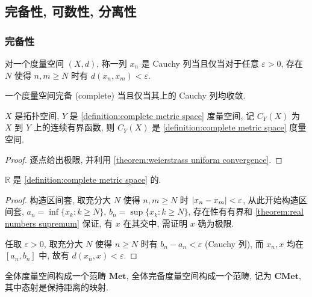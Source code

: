 \subsection{完备性, 可数性, 分离性}

\subsubsection{完备性}

\begin{definition}[Cauchy 列]
    对一个度量空间 \((X,d)\), 称一列 \(x_n\) 是 Cauchy 列当且仅当对于任意 \(\varepsilon > 0\), 存在 \(N\) 使得 \(n,m \ge N\) 时有 \(d(x_n,x_m) < \varepsilon\).
\end{definition}

\begin{definition}[完备]
    \label {definition:complete metric space}
    一个度量空间完备 (complete) 当且仅当其上的 Cauchy 列均收敛.
\end{definition}

\begin{corollary}
    \(X\) 是拓扑空间, \(Y\) 是 \ref{definition:complete metric space} 度量空间, 记 \(C_Y (X)\) 为 \(X\) 到 \(Y\) 上的连续有界函数, 则 \(C_Y (X)\) 是 \ref{definition:complete metric space} 度量空间.

    \begin{proof}
        逐点给出极限, 并利用 \ref{theorem:weierstrass uniform convergence}.
    \end{proof}
\end{corollary}

\begin{lemma}
    \(\mathbb{R}\) 是 \ref{definition:complete metric space} 的.

    \begin{proof}
        构造区间套, 取充分大 \(N\) 使得 \(n,m \ge N\) 时 \(\abs{x_n - x_m} < \varepsilon\),
        从此开始构造区间套, \(a_n = \inf \{x_k : k \ge N\}\), \(b_n = \sup \{x_k : k \ge N\}\),
        存在性有有界和 \ref {theorem:real numbers supremum} 保证, 有 \(x\) 在其交中, 需证明 \(x\) 确为极限.

        任取 \(\varepsilon > 0\), 取充分大 \(N\) 使得 \(n \ge N\) 时有 \(b_n - a_n < \varepsilon\) (Cauchy 列),
        而 \(x_n, x\) 均在 \([a_n,b_n]\) 中, 故有 \(d(x_n,x) < \varepsilon\).
    \end{proof}
\end{lemma}

\begin{definition}
    全体度量空间构成一个范畴 \(\mathbf{Met}\), 全体完备度量空间构成一个范畴, 记为 \(\mathbf{CMet}\), 其中态射是保持距离的映射.
\end{definition}

